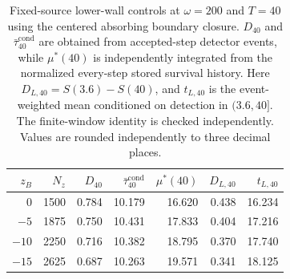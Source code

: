 \begin{table}[tb]
\caption{Fixed-source lower-wall controls at $\omega=200$ and $T=40$ using
the centered absorbing boundary closure. $D_{40}$ and
$\bar{\tau}^{\mathrm{cond}}_{40}$ are obtained from accepted-step detector
events, while $\mu^\ast(40)$ is independently integrated from the normalized
every-step stored survival history. Here $D_{L,40}=S(3.6)-S(40)$, and
$t_{L,40}$ is the event-weighted mean conditioned on detection in $(3.6,40]$.
The finite-window identity is checked independently. Values are rounded
independently to three decimal places.}
\label{tab:fixed-source-lowerwall-T40}
\centering
\begin{tabular}{rrrrrrr}
\hline\hline
$z_B$ & $N_z$ & $D_{40}$ & $\bar{\tau}^{\mathrm{cond}}_{40}$ &
$\mu^\ast(40)$ & $D_{L,40}$ & $t_{L,40}$ \\
\hline
$0$ & 1500 & 0.784 & 10.179 & 16.620 & 0.438 & 16.234 \\
$-5$ & 1875 & 0.750 & 10.431 & 17.833 & 0.404 & 17.216 \\
$-10$ & 2250 & 0.716 & 10.382 & 18.795 & 0.370 & 17.740 \\
$-15$ & 2625 & 0.687 & 10.263 & 19.571 & 0.341 & 18.125 \\
\hline\hline
\end{tabular}
\end{table}
